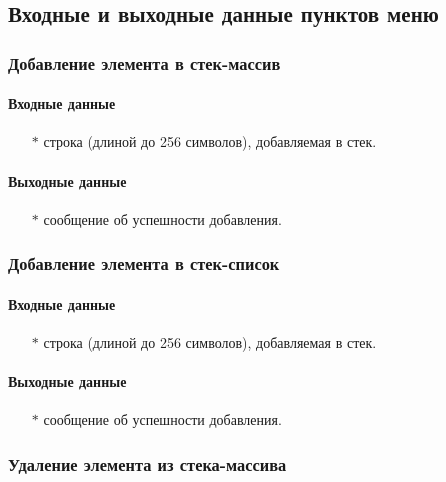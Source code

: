 \documentclass[a4paper,12pt]{extarticle}
\begin{document}
\subsection{Входные и выходные данные пунктов меню}
\subsubsection{Добавление элемента в стек-массив}


\paragraph{Входные данные}
\begin{itemize}
    \item[$*$] строка (длиной до 256 символов), добавляемая в стек.
\end{itemize}

\paragraph{Выходные данные}
\begin{itemize}
    \item[$*$] сообщение об успешности добавления.
\end{itemize}

\subsubsection{Добавление элемента в стек-список}


\paragraph{Входные данные}
\begin{itemize}
    \item[$*$] строка (длиной до 256 символов), добавляемая в стек.
\end{itemize}

\paragraph{Выходные данные}
\begin{itemize}
    \item[$*$] сообщение об успешности добавления.
\end{itemize}

\subsubsection{Удаление элемента из стека-массива}
\end{document}
